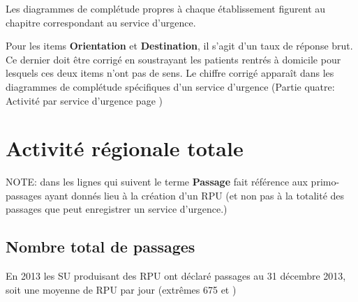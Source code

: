 \documentclass[12pt,english,french,twoside]{book}\usepackage[]{graphicx}\usepackage[]{color}
\newcommand{\ancourante}{2013\xspace}
\begin{document}
Les diagrammes de complétude propres à chaque établissement figurent au chapitre correspondant au service d'urgence.

Pour les items \textbf{Orientation} et \textbf{Destination}, il s'agit d'un taux de réponse brut. Ce dernier doit être corrigé en soustrayant les patients rentrés à domicile pour lesquels ces deux items n'ont pas de sens. Le chiffre corrigé apparaît dans les diagrammes de complétude spécifiques d'un service d'urgence (Partie quatre: Activité par service d'urgence page \pageref{partie4})

\newpage
\chapter{Activité régionale totale}

NOTE: dans les lignes qui suivent le terme \textbf{Passage} fait référence aux primo-passages ayant donnés lieu à la création d'un RPU (et non pas à la totalité des passages que peut enregistrer un service d'urgence.) 

\section{Nombre total de passages}







En \ancourante les SU produisant des RPU ont déclaré  passages au 31 décembre 2013, 
soit une moyenne de  RPU par jour (extrêmes 675 et )
\end{document}
